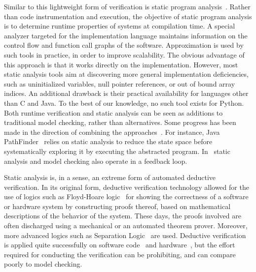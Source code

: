 \documentclass[sort&compress,preprint,3p]{elsarticle}
\begin{document}
Similar to this lightweight form of verification is static program
analysis~\cite{Schmidt98programanalysis}. Rather than code instrumentation and
execution, the objective of 
static program analysis is to determine runtime properties of systems at
compilation time.
A special analyzer targeted for the implementation language maintains
information on the control flow and function call graphs
of the software. Approximation is used by such tools in practice, in order to
improve scalability. The obvious advantage
of this approach is that it works directly on the implementation. However, most
static analysis tools aim at discovering 
more general implementation deficiencies, such as uninitialized variables, null
pointer references, or out of bound array indices. An additional drawback
is their 
practical availability for languages other than C and Java. To the best of our
knowledge, no such tool exists for Python. Both runtime verification and static analysis can be seen as additions to
traditional model checking, rather than alternatives. Some progress has been 
made in the direction of combining the
approaches~\cite{Java_PathFinder,Linux_driver,Brat01combiningstatic}. For
instance, Java PathFinder~\cite{Java_PathFinder}
relies on static analysis to reduce the state space before systematically
exploring it by executing the abstracted program.
In~\cite{Brat01combiningstatic}
static analysis and model checking also operate in a feedback loop. 

Static analysis is, in a sense, an extreme form of automated deductive
verification.  In its original form, deductive verification technology
allowed for the use of logics such as Floyd-Hoare logic~\cite{Hoa:69} for
showing the correctness of a software or hardware system by constructing
proofs thereof, based on mathematical descriptions of the behavior of
the system.  These days, the proofs involved are often discharged using a
mechanical or an automated theorem prover. Moreover, more advanced logics
such as Separation Logic~\cite{Rey:02} are used. Deductive verification
is applied quite successfully on software code~\cite{PMSJP:12,KAE+:10}
and hardware~\cite{AATH:10}, but the effort required for conducting the
verification can be prohibiting, and can compare poorly to model checking.
\end{document}
